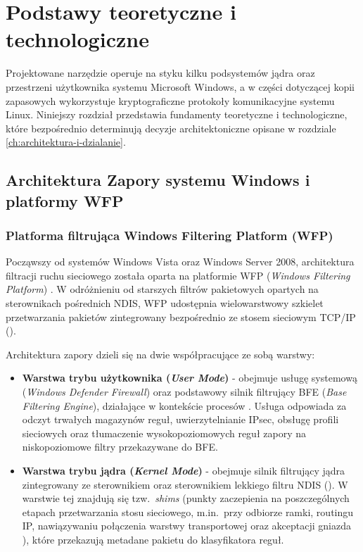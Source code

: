 \chapter{Podstawy teoretyczne i technologiczne}\label{ch:podstawy-technologiczne}

Projektowane narzędzie operuje na styku kilku podsystemów jądra oraz przestrzeni użytkownika systemu Microsoft Windows, a w części dotyczącej kopii zapasowych wykorzystuje kryptograficzne protokoły komunikacyjne systemu Linux. Niniejszy rozdział przedstawia fundamenty teoretyczne i technologiczne, które bezpośrednio determinują decyzje architektoniczne opisane w rozdziale \ref{ch:architektura-i-dzialanie}.

\section{Architektura Zapory systemu Windows i platformy WFP}\label{sec:architektura-zapory}

\subsection{Platforma filtrująca Windows Filtering Platform (WFP)}\label{subsec:architektura-wfp}

Począwszy od systemów Windows Vista oraz Windows Server 2008, architektura filtracji ruchu sieciowego została oparta na platformie WFP (\textit{Windows Filtering Platform}) \cite{ms-wfp}. W odróżnieniu od starszych filtrów pakietowych opartych na sterownikach pośrednich NDIS, WFP udostępnia wielowarstwowy szkielet przetwarzania pakietów zintegrowany bezpośrednio ze stosem sieciowym TCP/IP ().

Architektura zapory dzieli się na dwie współpracujące ze sobą warstwy:
\begin{itemize}
    \item \textbf{Warstwa trybu użytkownika (\textit{User Mode})} - obejmuje usługę systemową  (\textit{Windows Defender Firewall}) oraz podstawowy silnik filtrujący BFE (\textit{Base Filtering Engine}), działające w kontekście procesów . Usługa  odpowiada za odczyt trwałych magazynów reguł, uwierzytelnianie IPsec, obsługę profili sieciowych oraz tłumaczenie wysokopoziomowych reguł zapory na niskopoziomowe filtry przekazywane do BFE.
    \item \textbf{Warstwa trybu jądra (\textit{Kernel Mode})} - obejmuje silnik filtrujący jądra zintegrowany ze sterownikiem  oraz sterownikiem lekkiego filtru NDIS (). W warstwie tej znajdują się tzw.\ \textit{shims} (punkty zaczepienia na poszczególnych etapach przetwarzania stosu sieciowego, m.in.\ przy odbiorze ramki, routingu IP, nawiązywaniu połączenia warstwy transportowej  oraz akceptacji gniazda ), które przekazują metadane pakietu do klasyfikatora reguł.
\end{itemize}

